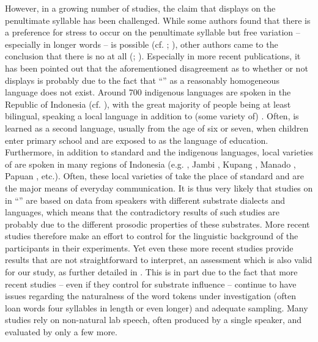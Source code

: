 \documentclass[output=paper
,modfonts
,nonflat]{langsci/langscibook}
\begin{document}
However, in a growing number of studies, the claim that  displays  on the penultimate syllable has been challenged. While some authors found that there is a preference for stress to occur on the penultimate syllable but free variation – especially in longer words – is possible (cf. \citealt{van1994}; \citealt{van2004}), other authors came to the conclusion that there is no  at all (\citealt{Zubkova1966}; \citealt{Odé1997}). Especially in more recent publications, it has been pointed out that the aforementioned disagreement as to whether or not  displays  is probably due to the fact that “” as a reasonably homogeneous language does not exist. Around 700 indigenous languages are spoken in the Republic of Indonesia (cf. \citealt{Ethnologue2018}), with the great majority of people being at least bilingual, speaking a local language in addition to (some variety of) . Often,  is learned as a second language, usually from the age of six or seven, when children enter primary school and are exposed to  as the language of education. Furthermore, in addition to standard  and the indigenous languages, local varieties of  are spoken in many regions of Indonesia (e.g.  , Jambi , Kupang , Manado , Papuan , etc.). Often, these local varieties of  take the place of standard  and are the major means of everyday communication. It is thus very likely that studies on  in “” are based on data from speakers with different substrate dialects and languages, which means that the contradictory results of such studies are probably due to the different prosodic properties of these substrates. More recent studies therefore make an effort to control for the linguistic background of the participants in their experiments. Yet even these more recent studies provide results that are not straightforward to interpret, an assessment which is also valid for our study, as further detailed in . This is in part due to the fact that more recent studies – even if they control for substrate influence – continue to have issues regarding the naturalness of the word tokens under investigation (often loan words four syllables in length or even longer) and adequate sampling. Many studies rely on non-natural lab speech, often produced by a single speaker, and evaluated by only a few more.    
\end{document}
